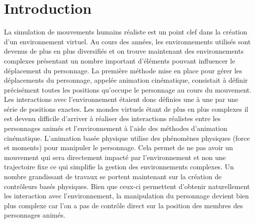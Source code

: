 \documentclass[runningheads,a4paper]{llncs}
\begin{document}
\section{Introduction}
%


La simulation de mouvements humains réaliste est un point clef dans la création d'un environnement virtuel. Au cours des années, les environnements utilisés sont devenus de plus en plus diversifiés et on trouve maintenant des environnements complexes présentant un nombre important d'éléments pouvant influencer le déplacement du personnage. La première méthode mise en place pour gérer les déplacements du personnage, appelée animation cinématique, consistait à définir précisément toutes les positions qu'occupe le personnage au cours du mouvement. Les interactions avec l'environnement étaient donc définies une à une par une série de positions exactes.  Les mondes virtuels étant de plus en plus complexes il est devenu difficile d'arriver à réaliser des interactions réalistes entre les personnages animés et l'environnement à l'aide des méthodes d'animation cinématique. L'animation basée physique utilise des phénomènes physiques (force et moments) pour manipuler le personnage. Cela permet de ne pas avoir un mouvement qui sera directement impacté par l'environnement et non une trajectoire fixe ce qui simplifie la gestion des environnements complexes. Un nombre grandissant de travaux se portent maintenant sur la création de contrôleurs basés physiques. Bien que ceux-ci permettent d'obtenir naturellement les interaction avec l'environnement, la manipulation du personnage devient bien plus complexe car l'on a pas de contrôle direct sur la position des membres des personnages animés.
\end{document}
